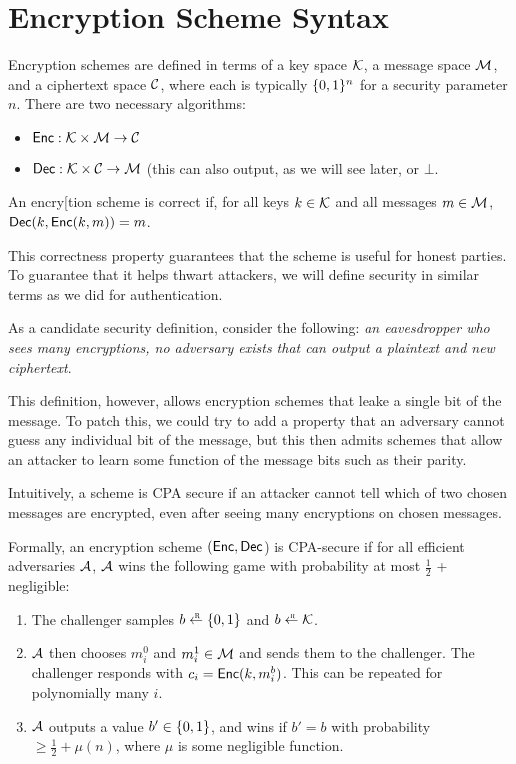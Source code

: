 \section{Encryption Scheme Syntax}
Encryption schemes are defined in terms of a key space $\mathcal{K}$, a message space $\mathcal{M}$, and a ciphertext space $\mathcal{C}$, where each is typically $\{0,1\}^n$ for a security parameter $n$. There are two necessary algorithms:

\begin{itemize}
	\item $\mathsf{Enc}: \mathcal{K} \times \mathcal{M} \rightarrow \mathcal{C}$
	\item $\mathsf{Dec}: \mathcal{K} \times \mathcal{C} \rightarrow \mathcal{M}$ (this can also output, as we will see later,  or $\bot$.
\end{itemize}

\begin{definition}
	An encry[tion scheme is correct if, for all keys $k \in \mathcal{K}$ and all messages $m \in \mathcal{M}$, $\mathsf{Dec}(k, \mathsf{Enc}(k, m)) = m$.
\end{definition}

This correctness property guarantees that the scheme is useful for honest parties. To guarantee that it helps thwart attackers, we will define security in similar terms as we did for authentication. 

As a candidate security definition, consider the following: \emph{an eavesdropper who sees many encryptions, no adversary exists that can output a plaintext and new ciphertext}.

This definition, however, allows encryption schemes that leake a single bit of the message. To patch this, we could try to add a property that an adversary cannot guess any individual bit of the message, but this then admits schemes that allow an attacker to learn some function of the message bits such as their parity.

\begin{definition}
	Intuitively, a scheme is CPA secure if an attacker cannot tell which of two chosen messages are encrypted, even after seeing many encryptions on chosen messages.

	Formally, an encryption scheme $(\mathsf{Enc}, \mathsf{Dec}$) is CPA-secure if for all efficient adversaries $\mathcal{A}$, $\mathcal{A}$ wins the following game with probability at most $\tfrac{1}{2}$ + negligible:

	\begin{enumerate}
		\item The challenger samples $b \rgets \bin$ and $b \rgets \calK$.
		\item $\mathcal{A}$ then chooses $m_i^0$ and $m_i^1 \in \mathcal{M}$ and sends them to the challenger. The challenger responds with $c_i = \mathsf{Enc}(k, m_i^b)$. This can be repeated for polynomially many $i$.
		\item $\mathcal{A}$ outputs a value $b' \in \{0,1\}$, and wins if $b'=b$ with probability $\geq \tfrac{1}{2} + \mu(n)$, where $\mu$ is some negligible function.
	\end{enumerate}
\end{definition}

